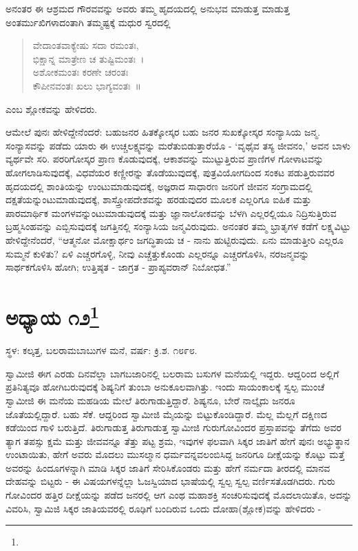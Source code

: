 ಅನಂತರ ಈ ಆಶ್ರಮದ ಗೌರವವನ್ನು ಅವರು ತಮ್ಮ ಹೃದಯದಲ್ಲಿ ಅನುಭವ ಮಾಡುತ್ತ ಮಾಡುತ್ತ ಅಂತರ್ಮುಖಿಗಳಾದಂತಾಗಿ ತಮ್ಮಷ್ಟಕ್ಕೆ ಮಧುರ ಸ್ವರದಲ್ಲಿ

\begin{verse}
ವೇದಾಂತವಾಕ್ಯೇಷು ಸದಾ ರಮಂತಃ,\\ಭಿಕ್ಷಾನ್ನ ಮಾತ್ರೇಣ ಚ ತುಷ್ಟಿಮಂತಃ~।\\ಅಶೋಕಮಂತಃ ಕರಣೇ ಚರಂತಃ\\ಕೌಪೀನವಂತಃ ಖಲು ಭಾಗ್ಯವಂತಃ~॥
\end{verse}

ಎಂಬ ಶ್ಲೋಕವನ್ನು ಹೇಳಿದರು.

ಆಮೇಲೆ ಪುನಃ ಹೇಳಿದ್ದೇನೆಂದರೆ: ಬಹುಜನರ ಹಿತಕ್ಕೋಸ್ಕರ ಬಹು ಜನರ ಸುಖಕ್ಕೋಸ್ಕರ ಸಂನ್ಯಾಸಿಯ ಜನ್ಮ. ಸಂನ್ಯಾಸವನ್ನು ಪಡೆದು ಯಾರು ಈ ಉಚ್ಚಲಕ್ಷ್ಯವನ್ನು ಮರೆತುಬಿಡುತ್ತಾರೆಯೊ - ‘ವೃಥೈವ ತಸ್ಯ ಜೀವನಂ,’ ಅವನ ಬಾಳು ವ್ಯರ್ಥವೇ ಸರಿ. ಪರರಿಗೋಸ್ಕರ ಪ್ರಾಣ ಕೊಡುವುದಕ್ಕೆ, ಆಕಾಶವನ್ನು ಮುಟ್ಟುತ್ತಿರುವ ಪ್ರಾಣಿಗಳ ಗೋಳಾಟವನ್ನು ಹೋಗಲಾಡಿಸುವುದಕ್ಕೆ, ವಿಧವೆಯರ ಕಣ್ಣೀರನ್ನು ತೊಡೆಯುವುದಕ್ಕೆ, ಪುತ್ರವಿಯೋಗದಿಂದ ಸಂಕಟ ಪಡುತ್ತಿರುವವರ ಹೃದಯದಲ್ಲಿ ಶಾಂತಿಯನ್ನು ಉಂಟುಮಾಡುವುದಕ್ಕೆ, ಅಜ್ಞರಾದ ಸಾಧಾರಣ ಜನರಿಗೆ ಜೀವನ ಸಂಗ್ರಾಮದಲ್ಲಿ ದಕ್ಷತೆಯನ್ನುಂಟುಮಾಡುವುದಕ್ಕೆ, ಶಾಸ್ತ್ರೋಪದೇಶವನ್ನು ಹರಡುವುದರ ಮೂಲಕ ಎಲ್ಲರಿಗೂ ಐಹಿಕ ಮತ್ತು ಪಾರಮಾರ್ಥಿಕ ಮಂಗಳವನ್ನುಂಟುಮಾಡುವುದಕ್ಕೆ ಮತ್ತು ಜ್ಞಾನಾಲೋಕವನ್ನು ಬೆಳಗಿ ಎಲ್ಲರಲ್ಲಿಯೂ ನಿದ್ರಿಸುತ್ತಿರುವ ಬ್ರಹ್ಮಸಿಂಹವನ್ನು ಎಬ್ಬಿಸುವುದಕ್ಕೆ ಜಗತ್ತಿನಲ್ಲಿ ಸಂನ್ಯಾಸಿಯ ಜನ್ಮವಿರುವುದು. ಅನಂತರ ತಮ್ಮ ಭ್ರಾತೃಗಳ ಕಡೆಗೆ ಲಕ್ಷ್ಯವಿಟ್ಟು ಹೇಳಿದ್ದೇನೆಂದರೆ, “ಆತ್ಮನೋ ಮೋಕ್ಷಾರ್ಥಂ ಜಗದ್ಧಿತಾಯ ಚ - ನಾನು ಹುಟ್ಟಿರುವುದು. ಏನು ಮಾಡುತ್ತೀರಿ ಎಲ್ಲರೂ ಸುಮ್ಮನೆ ಕುಳಿತು? ಏಳಿ ಎಚ್ಚರಗೊಳ್ಳಿ, ನೀವು ಎಚ್ಚೆತ್ತುಕೊಂಡು ಎಲ್ಲರನ್ನೂ ಎಚ್ಚರಗೊಳಿಸಿ, ನರಜನ್ಮವನ್ನು ಸಾರ್ಥಕಗೊಳಿಸಿ ಹೋಗಿ; ಉತ್ತಿಷ್ಠತ - ಜಾಗ್ರತ - ಪ್ರಾಪ್ಯವರಾನ್ ನಿಬೋಧತ.”

\newpage

\chapter[ಅಧ್ಯಾಯ ೧೨]{ಅಧ್ಯಾಯ ೧೨\protect\footnote{}}

\begin{center}
ಸ್ಥಳ: ಕಲ್ಕತ್ತ, ಬಲರಾಮಬಾಬುಗಳ ಮನೆ, ವರ್ಷ: ಕ್ರಿ.ಶ. ೧೮೯೮.
\end{center}

ಸ್ವಾಮೀಜಿ ಈಗ ಎರಡು ದಿನವೆಲ್ಲಾ ಬಾಗಬಜಾರಿನಲ್ಲಿ ಬಲರಾಮ ಬಸುಗಳ ಮನೆಯಲ್ಲಿ ಇದ್ದರು. ಆದ್ದರಿಂದ ಅಲ್ಲಿಗೆ ಪ್ರತಿನಿತ್ಯವೂ ಹೋಗಿಬರುವುದಕ್ಕೆ ಶಿಷ್ಯನಿಗೆ ತುಂಬಾ ಅನುಕೂಲವಾಗಿತ್ತು. ಇಂದು ಸಾಯಂಕಾಲಕ್ಕೆ ಸ್ವಲ್ಪ ಮುಂಚೆ ಸ್ವಾಮೀಜಿ ಈ ಮನೆಯ ಮಹಡಿಯ ಮೇಲೆ ತಿರುಗಾಡುತ್ತಿದ್ದಾರೆ. ಶಿಷ್ಯನೂ, ಬೇರೆ ನಾಲ್ಕೈದು ಜನರೂ ಜೊತೆಯಲ್ಲಿದ್ದಾರೆ. ಬಹು ಸೆಕೆ. ಆದ್ದರಿಂದ ಸ್ವಾಮೀಜಿ ಮೈಯನ್ನು ಬಿಟ್ಟುಕೊಂಡಿದ್ದಾರೆ. ಮೆಲ್ಲ ಮೆಲ್ಲಗೆ ದಕ್ಷಿಣದ ಕಡೆಯಿಂದ ಗಾಳಿ ಬರುತ್ತಿದೆ. ತಿರುಗಾಡುತ್ತ ತಿರುಗಾಡುತ್ತ ಸ್ವಾಮೀಜಿ ಗುರುಗೋವಿಂದರ ಪ್ರಸ್ತಾಪವನ್ನು ತೆಗೆದು ಅವರ ತ್ಯಾಗ ತಪಸ್ಸು ಕ್ಷಮೆ ಮತ್ತು ಜೀವವನ್ನೂ ತೆತ್ತು ಪಟ್ಟ ಶ್ರಮ, ಇವುಗಳ ಫಲವಾಗಿ ಸಿಕ್ಕರ ಜಾತಿಗೆ ಹೇಗೆ ಪುನಃ ಅಭ್ಯುತ್ಥಾನ ಉಂಟಾಯಿತು, ಹೇಗೆ ಅವರು ಮೊದಲು ಮುಸಲ್ಮಾನ ಧರ್ಮವನ್ನವಲಂಬಿಸಿದ್ದ ಜನರಿಗೂ ದೀಕ್ಷೆಯನ್ನು ಕೊಟ್ಟು ಮತ್ತೆ ಅವರನ್ನು ಹಿಂದೂಗಳನ್ನಾಗಿ ಮಾಡಿ ಸಿಕ್ಕರ ಜಾತಿಗೆ ಸೇರಿಸಿಕೊಂಡರು ಮತ್ತು ಹೇಗೆ ನರ್ಮದಾ ತೀರದಲ್ಲಿ ಮಾನವ ದೇಹವನ್ನು ಬಿಟ್ಟರು - ಈ ವಿಷಯಗಳನ್ನೆಲ್ಲಾ ಓಜಸ್ವಿಯಾದ ಭಾಷೆಯಲ್ಲಿ ಸ್ವಲ್ಪ ಸ್ವಲ್ಪ ವರ್ಣಿಸತೊಡಗಿದರು. ಗುರು ಗೋವಿಂದರ ಹತ್ತಿರ ದೀಕ್ಷೆಯನ್ನು ಪಡೆದ ಜನರಲ್ಲಿ ಆಗ ಎಂಥ ಮಹಾಶಕ್ತಿ ಸಂಚರಿಸುವುದಕ್ಕೆ ಮೊದಲಾಯಿತೊ, ಅದನ್ನು ವಿವರಿಸಿ, ಸ್ವಾಮಿಜಿ ಸಿಕ್ಕರ ಜಾತಿಯವರಲ್ಲಿ ರೂಢಿಗೆ ಬಂದಿರುವ ಒಂದು ದೋಹಾ(ಶ್ಲೋಕ)ವನ್ನು ಹೇಳಿದರು -

